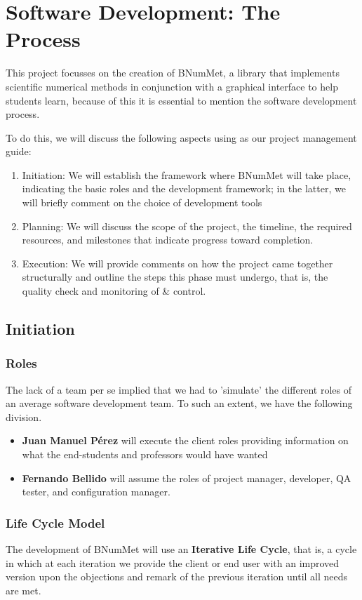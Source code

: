 \chapter{Software Development: The Process}
This project focusses on the creation of BNumMet, a library that implements scientific numerical methods in conjunction with a graphical interface to help students learn, because of this it is essential to mention the software development process. 

To do this, we will discuss the following aspects using \cite{PMBOK2013} as our project management guide:
\begin{enumerate}
    \item Initiation: We will establish the framework where BNumMet will take place, indicating the basic roles and the development framework; in the latter, we will briefly comment on the choice of development tools
    \item Planning: We will discuss the scope of the project, the timeline, the required resources, and milestones that indicate progress toward completion.
    \item Execution: We will provide comments on how the project came together structurally and outline the steps this phase must undergo, that is, the quality check and monitoring of \& control.
\end{enumerate}


\section{Initiation}
\subsection{Roles}
The lack of a team per se implied that we had to 'simulate' the different roles of an average software development team.
To such an extent, we have the following division.
\begin{itemize}
    \item \textbf{Juan Manuel Pérez} will execute the client roles providing information on what the end-students and professors would have wanted
    \item \textbf{Fernando Bellido} will assume the roles of project manager, developer, QA tester, and configuration manager.
\end{itemize}

\subsection{Life Cycle Model}
The development of BNumMet will use an \textbf{Iterative Life Cycle}, that is, a cycle in which at each iteration we provide the client or end user with an improved version upon the objections and remark of the previous iteration until all needs are met.

